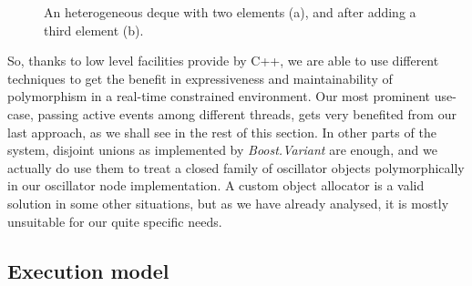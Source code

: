 \begin{figure}[h!]
  \centering


  \caption{An heterogeneous deque with two elements (a), and after
    adding a third element (b).}
  \label{fig:heterostructure}
\end{figure}

So, thanks to low level facilities provide by C++, we are able to use
different techniques to get the benefit in expressiveness and
maintainability of polymorphism in a real-time constrained
environment. Our most prominent use-case, passing active events among
different threads, gets very benefited from our last approach, as we
shall see in the rest of this section. In other parts of the system,
disjoint unions as implemented by \emph{Boost.Variant} are enough, and
we actually do use them to treat a closed family of oscillator objects
polymorphically in our oscillator node implementation. A custom object
allocator is a valid solution in some other situations, but as we have
already analysed, it is mostly unsuitable for our quite specific
needs.

\subsection{Execution model}

